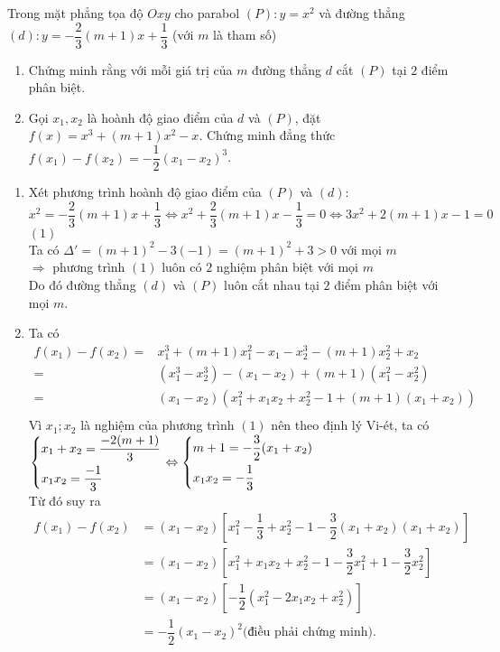    \begin{bt}%
   	Trong mặt phẳng tọa độ $Oxy$ cho parabol $(P):y=x^2$ và đường thẳng $(d):y=-\dfrac{2}{3}(m+1)x+\dfrac{1}{3}$ (với $m$ là tham số)
   	\begin{enumerate}
   		\item Chứng minh rằng với mỗi giá trị của $m$ đường thẳng $d$ cắt $(P)$ tại $2$ điểm phân biệt.
   		\item Gọi $x_1,x_2$ là hoành độ giao điểm của $d$ và $(P)$, đặt $f(x)=x^3+(m+1)x^2-x$. Chứng minh đẳng thức $f(x_1)-f(x_2)=-\dfrac{1}{2}(x_1-x_2)^3$.
   	\end{enumerate}
   	\loigiai
   	{
   		\begin{enumerate}
   			\item Xét phương trình hoành độ giao điểm của $(P)$ và $(d)$:\\
   			$x^2=-\dfrac{2}{3}(m+1)x+\dfrac{1}{3}\Leftrightarrow x^2+\dfrac{2}{3}(m+1)x-\dfrac{1}{3}=0\Leftrightarrow 3x^2 + 2(m+1)x-1=0$ $(1)$\\
   			Ta có $\Delta ' =(m+1)^2-3(-1)=(m+1)^2+3>0$ với mọi $m$\\
   			$\Rightarrow$ phương trình  $(1)$ luôn có $2$ nghiệm phân biệt với mọi $m$\\
   			Do đó đường thẳng $(d)$ và $(P)$ luôn cắt nhau tại $2$ điểm phân biệt với mọi $m$.
   			\item Ta có 		
   			\begin{align*}
   			f(x_1)-f(x_2) = &x_1^3+(m+1)x_1^2-x_1-x_2^3-(m+1)x_2^2+x_2 \\
   			=&(x_1^3-x_2^3)-(x_1-x_2)+(m+1)(x_1^2-x_2^2)\\
   			=& (x_1-x_2)(x_1^2+x_1x_2+x_2^2-1+(m+1)(x_1+x_2))\\
   			\end{align*}
   			Vì $x_1;x_2$ là nghiệm của phương trình $(1)$ nên theo định lý Vi-ét, ta có\\
   			$\left\{\begin{aligned}&x_1+x_2 = \dfrac{-2(m+1)}{3}\\
   				&x_1x_2 = \dfrac{-1}{3}\end{aligned}\right.\Leftrightarrow \left\{\begin{aligned}&m+1=-\dfrac{3}{2}(x_1+x_2)\\&x_1x_2=-\dfrac{1}{3}\end{aligned}\right.$\\
   			Từ đó suy ra \begin{align*}
   			f(x_1)-f(x_2)&=(x_1-x_2)\left[x_1^2-\dfrac{1}{3}+x_2^2-1-\dfrac{3}{2}(x_1+x_2)(x_1+x_2)\right]\\
   			&=(x_1-x_2)\left[x_1^2+x_1x_2+x_2^2-1-\dfrac{3}{2}x_1^2+1-\dfrac{3}{2}x_2^2\right]\\
   			&=(x_1-x_2)\left[-\dfrac{1}{2}(x_1^2-2x_1x_2+x_2^2)\right]\\
   			&=-\dfrac{1}{2}\left(x_1-x_2\right)^2\mbox{(điều phải chứng minh).}
   			\end{align*}
   		\end{enumerate}
   	}
   \end{bt}
